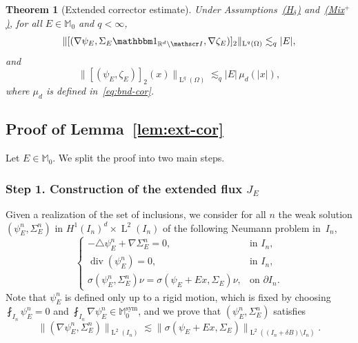 \documentclass[JEP,XML,SOM,Unicode,published]{cedram}
\let\mathcal\mathscr
\newcommand{\Hd}{\hyperref[Hd]{\textup{(H$_\delta$)}}\xspace}
\newcommand{\Mix}{\hyperref[Mix+]{\textup{(Mix$^+$)}}\xspace}
\let\mathds\mathbbm
\theoremstyle{plain}
\newtheorem{theor}{Theorem}[section]
\theoremstyle{definition}
\newcommand{\R}{\mathbb R}
\newcommand{\Ic}{\mathcal I}
\newcommand{\Md}{\mathbb M}
\newcommand{\Ld}{\operatorname{L}}
\newcommand{\Div}{{\operatorname{div}}}
\newcommand{\Sym}{{\operatorname{sym}}}
\newcommand{\step}[1]{\subsubsection*{Step #1}}
\begin{document}
\begin{theor}[Extended corrector estimate]\label{th:cor+}
Under Assumptions~\Hd and~\Mix, for all $E\in\Md_0$ and $q<\infty$,
\begin{equation}\label{eq:bnd-grad-cor1}
\|[(\nabla\psi_E,\Sigma_E\mathds1_{\R^d\setminus\Ic},\nabla\zeta_E)]_2\|_{\Ld^q(\Omega)}\lesssim_q |E|,
\end{equation}
and
\begin{equation}\label{eq:bnd-cor1}
\|[(\psi_E,\zeta_E)]_2(x)\|_{\Ld^q(\Omega)}\lesssim_q |E|\,\mu_d(|x|),
\end{equation}
where $\mu_d$ is defined in~\eqref{eq:bnd-cor}.
\end{theor}

\subsection{Proof of Lemma~\ref{lem:ext-cor}}\label{sec:pr-ext-cor}
Let $E\in\Md_0$.
We split the proof into two main steps.

\step{1. Construction of the extended flux $J_E$}
Given a realization of the set of inclusions, we consider for all $n$ the weak solution $(\psi_E^n,\Sigma_E^n)$ in $H^1(I_n)^d\times\Ld^2(I_n)$ of the following Neumann problem in~$I_n$,
\begin{equation}\label{eq:sol-psiEn}
\begin{cases}
-\triangle\psi_E^{n}+\nabla\Sigma_E^{n}=0,&\text{in $I_n$},\\
\Div(\psi_E^{n})=0,&\text{in $I_n$},\\
\sigma(\psi_E^{n},\Sigma_E^{n})\nu=\sigma(\psi_E+Ex,\Sigma_E)\nu,&\text{on $\partial I_n$}.
\end{cases}
\end{equation}
Note that $\psi_E^{n}$ is defined only up to a rigid motion, which is fixed by choosing \hbox{$\fint_{I_n}\!\psi_E^{n}\!=\!0$} and $\fint_{I_n}\nabla\psi_E^{n}\in\Md^\Sym_0$, and we prove that $(\psi_E^n,\Sigma_E^n)$ satisfies
\begin{equation}\label{eq:bnd-psinSign}
\|(\nabla\psi_E^n,\Sigma_E^n)\|_{\Ld^2(I_n)} \lesssim \|\sigma(\psi_E+Ex,\Sigma_E)\|_{\Ld^2((I_n+\delta B)\setminus I_n)}.
\end{equation}
\end{document}
